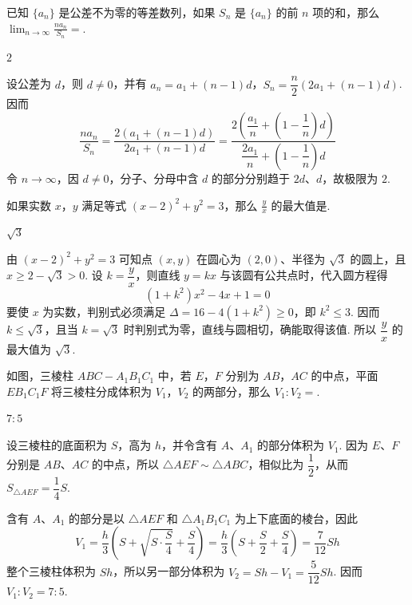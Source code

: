 \begin{problem}
已知 \(\{a_n\}\) 是公差不为零的等差数列，如果 \(S_n\) 是 \(\{a_n\}\) 的前 \(n\) 项的和，那么 \(\displaystyle\lim_{n\to\infty}\frac{na_n}{S_n}=\)\fillinblank{}.
\end{problem}

\begin{answer}\(2\)\end{answer}

\begin{solution}
设公差为 \(d\)，则 \(d\ne0\)，并有 \(a_n=a_1+(n-1)d\)，\(S_n=\dfrac n2\left(2a_1+(n-1)d\right)\). 因而
\[
\frac{na_n}{S_n}=\frac{2\left(a_1+(n-1)d\right)}{2a_1+(n-1)d}=\frac{2\left(\dfrac{a_1}{n}+\left(1-\dfrac1n\right)d\right)}{\dfrac{2a_1}{n}+\left(1-\dfrac1n\right)d}
\]
令 \(n\to\infty\)，因 \(d\ne0\)，分子、分母中含 \(d\) 的部分分别趋于 \(2d\)、\(d\)，故极限为 \(2\).
\end{solution}


\begin{problem}
如果实数 \(x\)，\(y\) 满足等式 \((x-2)^2+y^2=3\)，那么 \(\frac{y}{x}\) 的最大值是\fillinblank{}.
\end{problem}

\begin{answer}\(\sqrt{3}\)\end{answer}

\begin{solution}
由 \((x-2)^2+y^2=3\) 可知点 \((x,y)\) 在圆心为 \((2,0)\)、半径为 \(\sqrt3\) 的圆上，且 \(x\ge2-\sqrt3>0\). 设 \(k=\dfrac yx\)，则直线 \(y=kx\) 与该圆有公共点时，代入圆方程得
\[
(1+k^2)x^2-4x+1=0
\]
要使 \(x\) 为实数，判别式必须满足 \(\Delta=16-4(1+k^2)\ge0\)，即 \(k^2\le3\). 因而 \(k\le\sqrt3\)，且当 \(k=\sqrt3\) 时判别式为零，直线与圆相切，确能取得该值. 所以 \(\dfrac yx\) 的最大值为 \(\sqrt3\).
\end{solution}


\begin{problem}
如图，三棱柱 \(ABC-A_1B_1C_1\) 中，若 \(E\)，\(F\) 分别为 \(AB\)，\(AC\) 的中点，平面 \(EB_1C_1F\) 将三棱柱分成体积为 \(V_1\)，\(V_2\) 的两部分，那么 \(V_1:V_2=\)\fillinblank{}.

\end{problem}

\begin{answer}\(7:5\)\end{answer}

\begin{solution}
设三棱柱的底面积为 \(S\)，高为 \(h\)，并令含有 \(A\)、\(A_1\) 的部分体积为 \(V_1\). 因为 \(E\)、\(F\) 分别是 \(AB\)、\(AC\) 的中点，所以 \(\triangle AEF\sim\triangle ABC\)，相似比为 \(\dfrac12\)，从而 \(S_{\triangle AEF}=\dfrac14S\).

含有 \(A\)、\(A_1\) 的部分是以 \(\triangle AEF\) 和 \(\triangle A_1B_1C_1\) 为上下底面的棱台，因此
\[
V_1=\frac h3\left(S+\sqrt{S\cdot\frac S4}+\frac S4\right)=\frac h3\left(S+\frac S2+\frac S4\right)=\frac7{12}Sh
\]
整个三棱柱体积为 \(Sh\)，所以另一部分体积为 \(V_2=Sh-V_1=\dfrac5{12}Sh\). 因而 \(V_1:V_2=7:5\).
\end{solution}



